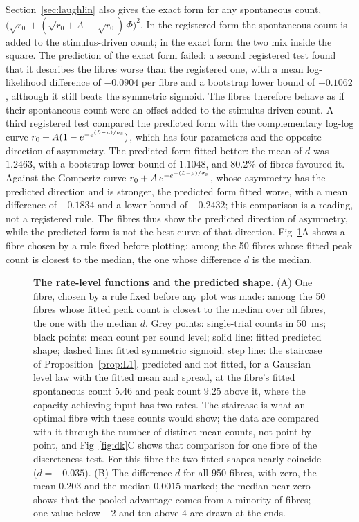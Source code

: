 \documentclass[10pt,letterpaper]{article}
\begin{document}
Section~\ref{sec:laughlin} also gives the exact form for any spontaneous count,
$\bigl(\sqrt{r_0}+(\sqrt{r_0+A}-\sqrt{r_0})\,\Phi\bigr)^2$. In the registered form the spontaneous count is added to the
stimulus-driven count; in the exact form the two mix inside the square. The prediction of the exact form failed: a second registered test found that it describes
the fibres worse than the registered one, with a mean log-likelihood difference of $-0.0904$ per fibre and a bootstrap lower bound of
$-0.1062$, although it still beats the symmetric sigmoid. The fibres therefore behave as if their spontaneous count were an offset
added to the stimulus-driven count.
A third registered test compared the predicted form with the complementary log-log curve $r_0+A(1-e^{-e^{(L-\mu)/\sigma_{\rm s}}})$,
which has four parameters and the opposite direction of asymmetry. The predicted form fitted better: the mean of $d$ was $1.2463$,
with a bootstrap lower bound of $1.1048$, and $80.2\%$ of fibres favoured it. Against the Gompertz curve
$r_0+A\,e^{-e^{-(L-\mu)/\sigma_{\rm s}}}$, whose asymmetry has the predicted direction and is stronger, the predicted form fitted
worse, with a mean difference of $-0.1834$ and a lower bound of $-0.2432$; this comparison is a reading, not a registered rule. The
fibres thus show the predicted direction of asymmetry, while the predicted form is not the best curve of that direction. Fig~\ref{fig:rlf}A shows a fibre
chosen by a rule fixed before plotting: among the 50 fibres whose fitted peak count is closest to the median, the one whose difference
$d$ is the median.

\begin{figure}[!h]
\centering
\caption{\textbf{The rate-level functions and the predicted shape.} (A) One fibre, chosen by a rule fixed before any plot was made:
among the 50 fibres whose fitted peak count is closest to the median over all fibres, the one with the median $d$. Grey points: single-trial
counts in 50~ms; black points: mean count per sound level; solid line: fitted predicted shape; dashed line: fitted symmetric sigmoid;
step line: the staircase of Proposition~\ref{prop:L1}, predicted and not fitted, for a Gaussian level law with the fitted mean and
spread, at the fibre's fitted spontaneous count $5.46$ and peak count $9.25$ above it, where the capacity-achieving input has two
rates. The staircase is what an optimal fibre with these counts would show; the data are compared with it through the number of
distinct mean counts, not point by point, and Fig~\ref{fig:dk}C shows that comparison for one fibre of the discreteness test. For this fibre the two fitted shapes nearly coincide ($d=-0.035$). (B) The difference $d$
for all 950 fibres, with zero, the mean $0.203$ and the median $0.0015$ marked; the median near zero shows that the pooled advantage
comes from a minority of fibres; one value below $-2$ and ten above $4$ are drawn at the ends.}\label{fig:rlf}
\end{figure}
\end{document}
